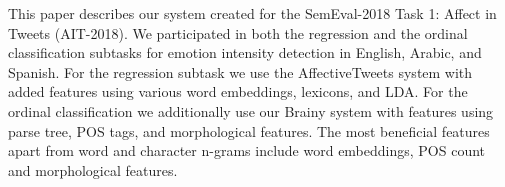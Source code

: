 This paper describes our system created for the SemEval-2018 Task 1: Affect in Tweets (AIT-2018). We participated in both the regression and the ordinal classification subtasks for emotion intensity detection in English, Arabic, and Spanish. For the regression subtask we use the AffectiveTweets system with added features using various word embeddings, lexicons, and LDA. For the ordinal classification we additionally use our Brainy system with features using parse tree, POS tags, and morphological features. The most beneficial features apart from word and character n-grams include word embeddings, POS count and  morphological features.
